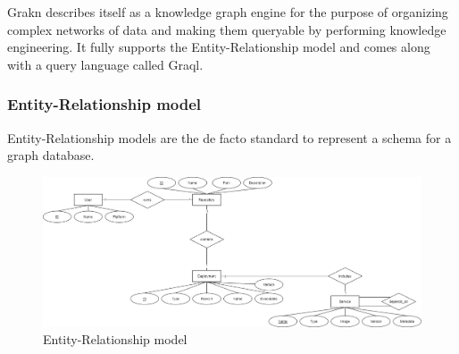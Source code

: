 Grakn describes itself as a knowledge graph engine for the purpose of organizing complex networks of data and making them queryable by performing knowledge engineering. It fully supports the Entity-Relationship model and comes along with a query language called Graql. 

\subsubsection{Entity-Relationship model}
Entity-Relationship models are the de facto standard to represent a schema for a graph database.
\begin{figure}[H]
    \centering
    \includegraphics[width=1.2\paperwidth,height=1.2\paperheight,keepaspectratio,angle=270]{graphics/er_database.png}
    \caption{Entity-Relationship model}
    \label{fig:er_model}
\end{figure}

